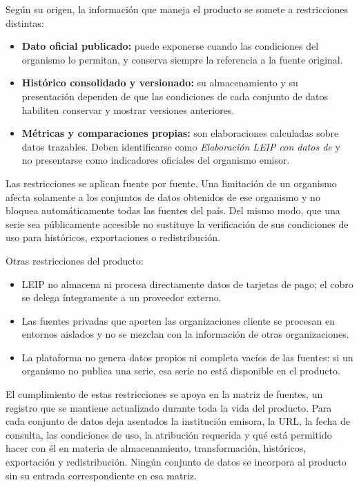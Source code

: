 \documentclass[11pt,a4paper]{article}
\newcommand{\proyectoNombre}{LEIP}
\begin{document}
Seg\'un su origen, la informaci\'on que maneja el producto se somete a
restricciones distintas:

\begin{itemize}
  \item \textbf{Dato oficial publicado:} puede exponerse cuando las condiciones
        del organismo lo permitan, y conserva siempre la referencia a la fuente
        original.
  \item \textbf{Hist\'orico consolidado y versionado:} su almacenamiento y su
        presentaci\'on dependen de que las condiciones de cada conjunto de datos
        habiliten conservar y mostrar versiones anteriores.
  \item \textbf{M\'etricas y comparaciones propias:} son elaboraciones
        calculadas sobre datos trazables. Deben identificarse como
        \emph{Elaboraci\'on LEIP con datos de} y no presentarse como
        indicadores oficiales del organismo emisor.
\end{itemize}

Las restricciones se aplican fuente por fuente. Una limitaci\'on de un organismo
afecta solamente a los conjuntos de datos obtenidos de ese organismo y no
bloquea autom\'aticamente todas las fuentes del pa\'is. Del mismo modo, que una
serie sea p\'ublicamente accesible no sustituye la verificaci\'on de sus
condiciones de uso para hist\'oricos, exportaciones o redistribuci\'on.

Otras restricciones del producto:

\begin{itemize}
  \item \proyectoNombre{} no almacena ni procesa directamente datos de tarjetas
        de pago; el cobro se delega \'integramente a un proveedor externo.
  \item Las fuentes privadas que aporten las organizaciones cliente se procesan
        en entornos aislados y no se mezclan con la informaci\'on de otras
        organizaciones.
  \item La plataforma no genera datos propios ni completa vac\'ios de las
        fuentes: si un organismo no publica una serie, esa serie no est\'a
        disponible en el producto.
\end{itemize}

El cumplimiento de estas restricciones se apoya en la matriz de fuentes, un
registro que se mantiene actualizado durante toda la vida del producto. Para
cada conjunto de datos deja asentados la instituci\'on emisora, la URL, la
fecha de consulta, las condiciones de uso, la atribuci\'on requerida y qu\'e
est\'a permitido hacer con \'el en materia de almacenamiento, transformaci\'on,
hist\'oricos, exportaci\'on y redistribuci\'on. Ning\'un conjunto de datos se
incorpora al producto sin su entrada correspondiente en esa matriz.
\end{document}
